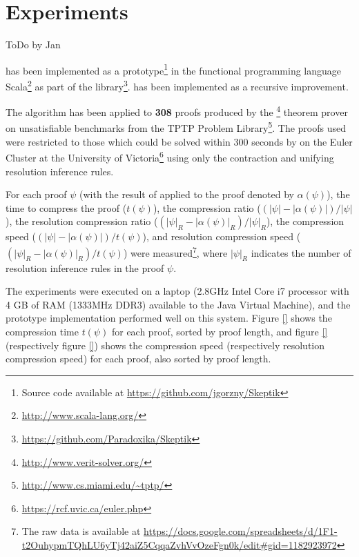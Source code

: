 
\section{Experiments} \label{sec:exp}

ToDo by Jan

{\LowerUnits} has been implemented as a prototype\footnote{Source code available at \url{https://github.com/jgorzny/Skeptik}} in the functional programming language Scala\footnote{\url{http://www.scala-lang.org/}} as part of the \skeptik
 library\footnote{\url{https://github.com/Paradoxika/Skeptik}}. {\LowerUnits} has been implemented as a
 recursive  improvement.

The algorithm has been applied to {\bf 308} proofs produced by the {\SPASS}\footnote{\url{http://www.verit-solver.org/}} theorem prover on unsatisfiable benchmarks from the TPTP Problem Library\footnote{\url{http://www.cs.miami.edu/~tptp/}}. The proofs used were restricted to those which could be solved within 300 seconds by {\SPASS} on the Euler Cluster at the University of Victoria\footnote{\url{https://rcf.uvic.ca/euler.php}} using only the contraction and unifying resolution inference rules.

For each proof $\psi$ (with the result of {\LowerUnits} applied to the proof denoted by $\alpha(\psi)$), the time to compress the proof ($t(\psi)$), the compression ratio ($(|\psi|-|\alpha(\psi)|)/|\psi|$), the resolution compression ratio  ($(|\psi|_R-|\alpha(\psi)|_R)/|\psi|_R$), the compression speed ($(|\psi|-|\alpha(\psi)|)/t(\psi)$), and resolution compression speed ($(|\psi|_R-|\alpha(\psi)|_R)/t(\psi)$) were measured\footnote{The raw data is available at \url{https://docs.google.com/spreadsheets/d/1F1-t2OuhypmTQhLU6yTj42aiZ5CqqaZvhVvOzeFgn0k/edit\#gid=1182923972}}, where $|\psi|_R$ indicates the number of resolution inference rules in the proof $\psi$.


The experiments were executed on a laptop (2.8GHz Intel Core i7 processor with 4 GB of RAM (1333MHz DDR3) available to the Java Virtual Machine), and the prototype implementation performed well on this system. Figure \ref{} shows the compression time $t(\psi)$ for each proof, sorted by proof length, and figure \ref{} (respectively figure \ref{}) shows the compression speed (respectively resolution compression speed) for each proof, also sorted by proof length.

